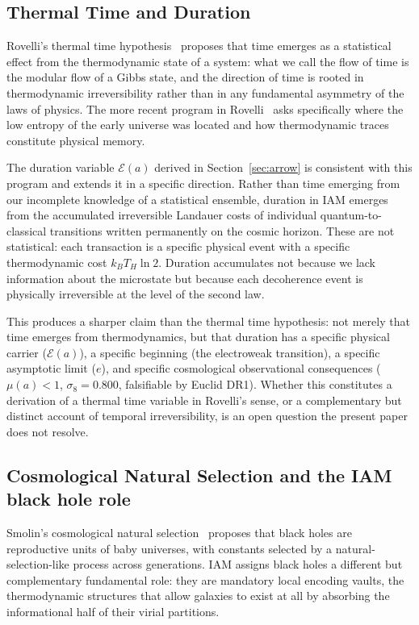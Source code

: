 \documentclass[12pt,a4paper]{article}
\begin{document}
\subsection{Thermal Time and Duration}

Rovelli's thermal time hypothesis~\citep{Connes1994,Rovelli1993} proposes
that time emerges as a statistical effect from the thermodynamic state of
a system: what we call the flow of time is the modular flow of a
Gibbs state, and the direction of time is rooted in thermodynamic
irreversibility rather than in any fundamental asymmetry of the laws of
physics. The more recent program in Rovelli~\citep{Rovelli2019,Rovelli2020}
asks specifically where the low entropy of the early universe was located
and how thermodynamic traces constitute physical memory.

The duration variable $\mathcal{E}(a)$ derived in Section~\ref{sec:arrow}
is consistent with this program and extends it in a specific direction.
Rather than time emerging from our incomplete knowledge of a statistical
ensemble, duration in IAM emerges from the accumulated irreversible
Landauer costs of individual quantum-to-classical transitions written
permanently on the cosmic horizon. These are not statistical: each
transaction is a specific physical event with a specific thermodynamic
cost $k_B T_H \ln 2$. Duration accumulates not because we lack information
about the microstate but because each decoherence event is physically
irreversible at the level of the second law.

This produces a sharper claim than the thermal time hypothesis: not merely
that time emerges from thermodynamics, but that duration has a specific
physical carrier ($\mathcal{E}(a)$), a specific beginning (the electroweak
transition), a specific asymptotic limit ($e$), and specific cosmological
observational consequences ($\mu(a) < 1$, $\sigma_8 = 0.800$, falsifiable
by Euclid DR1). Whether this constitutes a derivation of a thermal time
variable in Rovelli's sense, or a complementary but distinct account of
temporal irreversibility, is an open question the present paper does not
resolve.

\subsection{Cosmological Natural Selection and the IAM black hole role}

Smolin's cosmological natural selection~\citep{Smolin1992,Smolin1997}
proposes that black holes are reproductive units of baby universes,
with constants selected by a natural-selection-like process across
generations. IAM assigns black holes a different but complementary
fundamental role: they are mandatory local encoding vaults, the
thermodynamic structures that allow galaxies to exist at all by absorbing
the informational half of their virial partitions.
\end{document}
